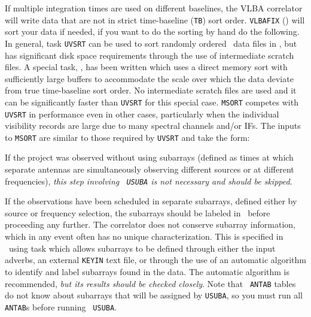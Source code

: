 If multiple integration times are used on different baselines, the
VLBA correlator will write data that are not in strict time-baseline
({\tt TB}) sort order.  {\tt VLBAFIX} () will sort
your data if needed, if you want to do the sorting by hand do the
 following. In general, task {\tt UVSRT} can be used to
sort randomly ordered \uv\ data files in \AIPS, but has significant
disk space requirements through the use of intermediate scratch files.
A special task, {\tt {}}, has been written which uses a
direct memory sort with sufficiently large buffers to accommodate the
scale over which the data deviate from true time-baseline sort order.
No intermediate scratch files are used and it can be significantly
faster than {\tt UVSRT} for this special case.  {\tt MSORT} competes
with {\tt UVSRT} in performance even in other cases, particularly when
the individual visibility records are large due to many spectral
channels and/or IFs.  The inputs to {\tt MSORT} are similar to those
required by {\tt UVSRT} and take the form:


If the project was observed without using subarrays (defined as times
at which separate antennas are simultaneously observing different
sources or at different frequencies), {\it this step involving\/ {\tt
USUBA} is not necessary and should be skipped\/}.

If the observations have been scheduled in separate subarrays, defined
either by source or frequency selection, the subarrays should be
labeled in \AIPS\ before proceeding any further.  The 
correlator does not conserve subarray information, which in any event
often has no unique characterization.  This is specified in \AIPS\
using task {\tt {}} which allows subarrays to be defined
through either the input adverbs, an external {\tt KEYIN} text file,
or through the use of an automatic algorithm to identify and label
subarrays found in the data. The automatic algorithm is recommended,
{\it but its results should be checked closely}.  Note that {\tt
ANTAB} tables do not know about subarrays that will be assigned by
{\tt USUBA}, so you must run all {\tt ANTAB}s before running {\tt
USUBA}\@.

